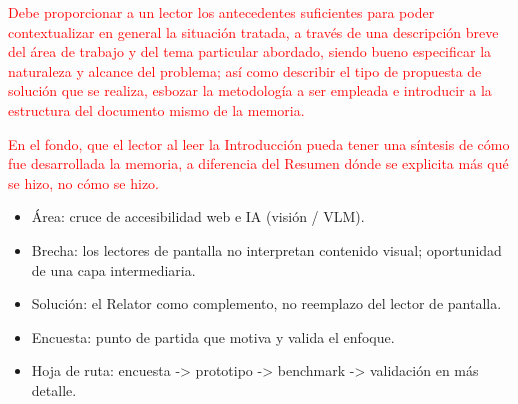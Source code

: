 
\textcolor{red}{Debe proporcionar a un lector los antecedentes suficientes para poder contextualizar en general la situación tratada, a través de una descripción breve del área de trabajo y del tema particular abordado, siendo bueno especificar la naturaleza y alcance del problema; así como describir el tipo de propuesta de solución que se realiza, esbozar la metodología a ser empleada e introducir a la estructura del documento mismo de la memoria.}

\textcolor{red}{En el fondo, que el lector al leer la Introducción pueda tener una síntesis de cómo fue desarrollada la memoria, a diferencia del Resumen dónde se explicita más qué se hizo, no cómo se hizo.}

\begin{itemize}
    \item Área: cruce de accesibilidad web e IA (visión / VLM).
    \item Brecha: los lectores de pantalla no interpretan contenido visual; oportunidad de una capa intermediaria.
    \item Solución: el Relator como complemento, no reemplazo del lector de pantalla.
    \item Encuesta: punto de partida que motiva y valida el enfoque.
    \item Hoja de ruta: encuesta -> prototipo -> benchmark -> validación en más detalle.
\end{itemize}
